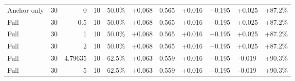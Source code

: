 \begin{table}[htbp]
\begin{tabular}{lrrrccccccc}
Anchor only & 30 & 0 & 10 & 50.0\% & +0.068 & 0.565 & +0.016 & +0.195 & +0.025 & +87.2\% \\
Full & 30 & 0.5 & 10 & 50.0\% & +0.068 & 0.565 & +0.016 & +0.195 & +0.025 & +87.2\% \\
Full & 30 & 1 & 10 & 50.0\% & +0.068 & 0.565 & +0.016 & +0.195 & +0.025 & +87.2\% \\
Full & 30 & 2 & 10 & 50.0\% & +0.068 & 0.565 & +0.016 & +0.195 & +0.025 & +87.2\% \\
Full & 30 & 4.79635 & 10 & 62.5\% & +0.063 & 0.559 & +0.016 & +0.195 & -0.019 & +90.3\% \\
Full & 30 & 5 & 10 & 62.5\% & +0.063 & 0.559 & +0.016 & +0.195 & -0.019 & +90.3\% \\
\bottomrule
\end{tabular}
\end{table}